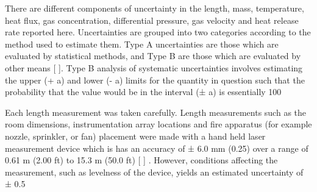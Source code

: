 \documentclass[12pt,oneside]{book}
\begin{document}
There are different components of uncertainty in the length, mass, temperature, heat flux, gas concentration, differential pressure, gas velocity and heat release rate reported here. Uncertainties are grouped into two categories according to the method used to estimate them. Type A uncertainties are those which are evaluated by statistical methods, and Type B are those which are evaluated by other means  [ ]. Type B analysis of systematic uncertainties involves estimating the upper (+ a) and lower (- a) limits for the quantity in question such that the probability that the value would be in the interval (± a) is essentially 100 %

Each length measurement was taken carefully. Length measurements such as the room dimensions, instrumentation array locations and fire apparatus (for example nozzle, sprinkler, or fan) placement were made with a hand held laser measurement device which is has an accuracy of ± 6.0 mm (0.25) over a range of 0.61 m (2.00 ft) to 15.3 m (50.0 ft) [ ] .  However, conditions affecting the measurement, such as levelness of the device, yields an estimated uncertainty of ± 0.5 %
\end{document}

